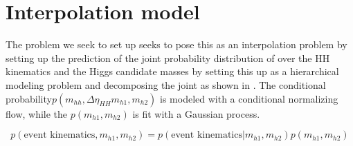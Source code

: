 \section{Interpolation model}
\label{sec:interp-models}


The problem we seek to set up seeks to pose this as an interpolation problem by setting up the prediction of the joint probability distribution of over the HH kinematics and the Higgs candidate masses by setting this up as a hierarchical modeling problem and decomposing the joint as shown in . The conditional probability$p(m_{hh}, \Delta \eta_{HH} m_{h1}, m_{h2}) $ is modeled with a conditional normalizing flow, while the $p (m_{h1}, m_{h2})$ is fit with a Gaussian process. 

\begin{equation}
    p(\text{event kinematics}, m_{h1}, m_{h2}) = p(\text{event kinematics} | m_{h1}, m_{h2}) p (m_{h1}, m_{h2})
    \label{eq:joint-HH}
\end{equation}



